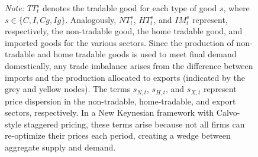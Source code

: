 \documentclass[a4paper,11pt]{article}
\newcommand{\desc}[1]{\vspace{0mm} \footnotesize \begin{minipage}{0.9\textwidth} \emph{Note: }{#1} \end{minipage}}
\numberwithin{equation}{section}
\begin{document}
\begin{figure}[H]
        
        \desc{$TT_t^s$ denotes the tradable good for each type of good $s$, where $s \in \{C, I, Cg, Ig\}$. Analogously, $NT_t^s$, $HT_t^s$, and $IM_t^s$ represent, respectively, the non-tradable good, the home tradable good, and imported goods for the various sectors. Since the production of non-tradable and home tradable goods is used to meet final demand domestically, any trade imbalance arises from the difference between imports and the production allocated to exports (indicated by the grey and yellow nodes). The terms $s_{N,t}$, $s_{H,t}$, and $s_{X,t}$ represent price dispersion in the non-tradable, home-tradable, and export sectors, respectively. In a New Keynesian framework with Calvo-style staggered pricing, these terms arise because not all firms can re-optimize their prices each period, creating a wedge between aggregate supply and demand.}
\end{figure}
\end{document}
